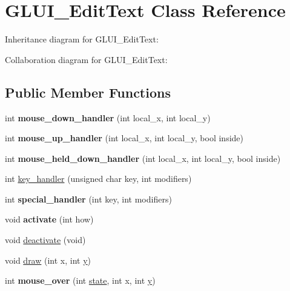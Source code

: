 \hypertarget{class_g_l_u_i___edit_text}{\section{G\+L\+U\+I\+\_\+\+Edit\+Text Class Reference}
\label{class_g_l_u_i___edit_text}
}


Inheritance diagram for G\+L\+U\+I\+\_\+\+Edit\+Text\+:


Collaboration diagram for G\+L\+U\+I\+\_\+\+Edit\+Text\+:
\subsection*{Public Member Functions}
\begin{DoxyCompactItemize}
\item 
\hypertarget{class_g_l_u_i___edit_text_a096021e2d0b258ffee0b36988850677b}{int {\bfseries mouse\+\_\+down\+\_\+handler} (int local\+\_\+x, int local\+\_\+y)}\label{class_g_l_u_i___edit_text_a096021e2d0b258ffee0b36988850677b}

\item 
\hypertarget{class_g_l_u_i___edit_text_ac05967e2a8826e2bf796c65758da47ea}{int {\bfseries mouse\+\_\+up\+\_\+handler} (int local\+\_\+x, int local\+\_\+y, bool inside)}\label{class_g_l_u_i___edit_text_ac05967e2a8826e2bf796c65758da47ea}

\item 
\hypertarget{class_g_l_u_i___edit_text_af98242599d889464f6b8dfb3aa23f6b4}{int {\bfseries mouse\+\_\+held\+\_\+down\+\_\+handler} (int local\+\_\+x, int local\+\_\+y, bool inside)}\label{class_g_l_u_i___edit_text_af98242599d889464f6b8dfb3aa23f6b4}

\item 
int \hyperlink{class_g_l_u_i___edit_text_a92fcd78877375cb2bba3b5e9f88635b6}{key\+\_\+handler} (unsigned char key, int modifiers)
\item 
\hypertarget{class_g_l_u_i___edit_text_a81478f6a0a9ba0c2dc715e0b3730077e}{int {\bfseries special\+\_\+handler} (int key, int modifiers)}\label{class_g_l_u_i___edit_text_a81478f6a0a9ba0c2dc715e0b3730077e}

\item 
\hypertarget{class_g_l_u_i___edit_text_a071ddcac9844e7d0bed23a7c0dabadd1}{void {\bfseries activate} (int how)}\label{class_g_l_u_i___edit_text_a071ddcac9844e7d0bed23a7c0dabadd1}

\item 
void \hyperlink{class_g_l_u_i___edit_text_a4a83b7bc0b6d60e4fa0dd797b49255ab}{deactivate} (void)
\item 
void \hyperlink{class_g_l_u_i___edit_text_af5027cba2aeff900776ea1cbea37fdd8}{draw} (int x, int \hyperlink{_ice_utils_8h_aa7ffaed69623192258fb8679569ff9ba}{y})
\item 
\hypertarget{class_g_l_u_i___edit_text_ad21f31b7e27b0f840ee0b8a984341b38}{int {\bfseries mouse\+\_\+over} (int \hyperlink{structstate}{state}, int x, int \hyperlink{_ice_utils_8h_aa7ffaed69623192258fb8679569ff9ba}{y})}\label{class_g_l_u_i___edit_text_ad21f31b7e27b0f840ee0b8a984341b38}


\end{DoxyCompactItemize}
